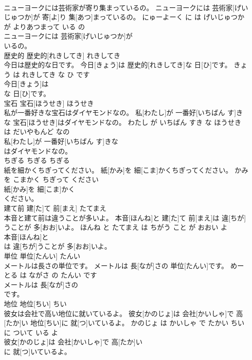 \documentclass[8pt]{extreport}
\begin{document}
\begin{CJK}{UTF8}{min}
\\	ニューヨークには芸術家が寄り集まっているの。	ニューヨークには 芸術家[げいじゅつか]が 寄[よ]り 集[あつ]まっているの。	にゅーよーく に は げいじゅつか が よりあつまって いる の	
\\	ニューヨークには 芸術家[げいじゅつか]が
\\	いるの。			
\\	歴史的	歴史的[れきしてき]	れきしてき	
\\	今日は歴史的な日です。	今日[きょう]は 歴史的[れきしてき]な 日[ひ]です。	きょう は れきしてき な ひ です	
\\	今日[きょう]は
\\	な 日[ひ]です。			
\\	宝石	宝石[ほうせき]	ほうせき	
\\	私が一番好きな宝石はダイヤモンドなの。	私[わたし]が 一番好[いちばん す]きな 宝石[ほうせき]はダイヤモンドなの。	わたし が いちばん すき な ほうせき は だいやもんど なの	
\\	私[わたし]が 一番好[いちばん す]きな
\\	はダイヤモンドなの。			
\\	ちぎる	ちぎる	ちぎる	
\\	紙を細かくちぎってください。	紙[かみ]を 細[こま]かくちぎってください。	かみ を こまかく ちぎって ください	
\\	紙[かみ]を 細[こま]かく
\\	ください。			
\\	建て前	建[た]て 前[まえ]	たてまえ	
\\	本音と建て前は違うことが多いよ。	本音[ほんね]と 建[た]て 前[まえ]は 違[ちが]うことが 多[おお]いよ。	ほんね と たてまえ は ちがう こと が おおい よ	
\\	本音[ほんね]と
\\	は 違[ちが]うことが 多[おお]いよ。			
\\	単位	単位[たんい]	たんい	
\\	メートルは長さの単位です。	メートルは 長[なが]さの 単位[たんい]です。	めーとる は ながさ の たんい です	
\\	メートルは 長[なが]さの
\\	です。			
\\	地位	地位[ちい]	ちい	
\\	彼女は会社で高い地位に就いているよ。	彼女[かのじょ]は 会社[かいしゃ]で 高[たか]い 地位[ちい]に 就[つ]いているよ。	かのじょ は かいしゃ で たかい ちい に ついて いる よ	
\\	彼女[かのじょ]は 会社[かいしゃ]で 高[たか]い
\\	に 就[つ]いているよ。			

\end{CJK}
\end{document}
